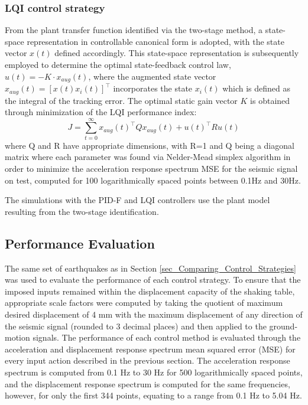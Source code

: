 \documentclass[  10pt, twoside]{report} %
\numberwithin{equation}{chapter}
\begin{document}
\subsubsection{LQI control strategy}
From the plant transfer function identified via the two-stage method, a state-space representation in controllable canonical form is adopted, with the state vector $x(t)$ defined accordingly. This state-space representation is subsequently employed to determine the optimal state-feedback control law, $u(t) = -K \cdot x_{aug}(t)$, where the augmented state vector $x_{aug}(t) = [x(t) x_i(t)]^\intercal$ incorporates the state $x_i(t)$ which is defined as the integral of the tracking error. The optimal static gain vector $K$ is obtained through minimization of the LQI performance index:
\begin{equation}
 J = \sum_{t=0}^{\infty}{{x_{aug}(t)}^\intercal Q} x_{aug}(t)+{u(t)}^\intercal R u(t) 
\end{equation}
where Q and R have appropriate dimensions, with R=1 and Q being a diagonal matrix where each parameter was found via Nelder-Mead simplex algorithm \citep{lagarias1998} in order to minimize the acceleration response spectrum MSE for the seismic signal on test, computed for 100 logarithmically spaced points between 0.1Hz and 30Hz. 

The simulations with the PID-F and LQI controllers use the plant model resulting from the two-stage identification.

\subsection{Performance Evaluation}

The same set of earthquakes as in Section \ref{sec_Comparing_Control_Strategies} was used to evaluate the performance of each control strategy. To ensure that the imposed inputs remained within the displacement capacity of the shaking table, appropriate scale factors were computed by taking the quotient of maximum desired displacement of 4 mm with the maximum displacement of any direction of the seismic signal (rounded to 3 decimal places) and then applied to the ground-motion signals. 
The performance of each control method is evaluated through the acceleration and displacement response spectrum mean squared error (MSE) for every input action described in the previous section. The acceleration response spectrum is computed from 0.1 Hz to 30 Hz for 500 logarithmically spaced points, and the displacement response spectrum is computed for the same frequencies, however, for only the first 344 points, equating to a range from 0.1 Hz to 5.04 Hz.
\end{document}
